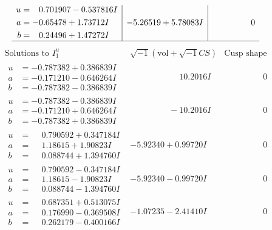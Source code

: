 \documentclass[1p]{elsarticle_modified}
\theoremstyle{definition}
\newcommand{\I}{\sqrt{-1}}
\begin{document}
$$\begin{array}{c|c|c}
\begin{aligned}
u &= \phantom{-}0.701907 - 0.537816 I \\
a &= -0.65478 + 1.73712 I \\
b &= \phantom{-}0.24496 + 1.47272 I\end{aligned}
 & -5.26519 + 5.78083 I & \phantom{-0.000000 } 0\\
 \hline 
 \end{array}$$\newpage$$\begin{array}{c|c|c}  
\text{Solutions to }I^u_{1}& \I (\text{vol} + \sqrt{-1}CS) & \text{Cusp shape}\\
 \hline 
\begin{aligned}
u &= -0.787382 + 0.386839 I \\
a &= -0.171210 - 0.646264 I \\
b &= -0.787382 - 0.386839 I\end{aligned}
 & \phantom{-0.000000 -}10.2016 I & \phantom{-0.000000 } 0 \\ \hline\begin{aligned}
u &= -0.787382 - 0.386839 I \\
a &= -0.171210 + 0.646264 I \\
b &= -0.787382 + 0.386839 I\end{aligned}
 & \phantom{-0.000000 } -10.2016 I & \phantom{-0.000000 } 0 \\ \hline\begin{aligned}
u &= \phantom{-}0.790592 + 0.347184 I \\
a &= \phantom{-}1.18615 + 1.90823 I \\
b &= \phantom{-}0.088744 + 1.394760 I\end{aligned}
 & -5.92340 + 0.99720 I & \phantom{-0.000000 } 0 \\ \hline\begin{aligned}
u &= \phantom{-}0.790592 - 0.347184 I \\
a &= \phantom{-}1.18615 - 1.90823 I \\
b &= \phantom{-}0.088744 - 1.394760 I\end{aligned}
 & -5.92340 - 0.99720 I & \phantom{-0.000000 } 0 \\ \hline\begin{aligned}
u &= \phantom{-}0.687351 + 0.513075 I \\
a &= \phantom{-}0.176990 - 0.369508 I \\
b &= \phantom{-}0.262179 - 0.400166 I\end{aligned}
 & -1.07235 - 2.41410 I & \phantom{-0.000000 } 0 \\ \hline\begin{aligned}

\end{aligned}
\end{array}$$
\end{document}
